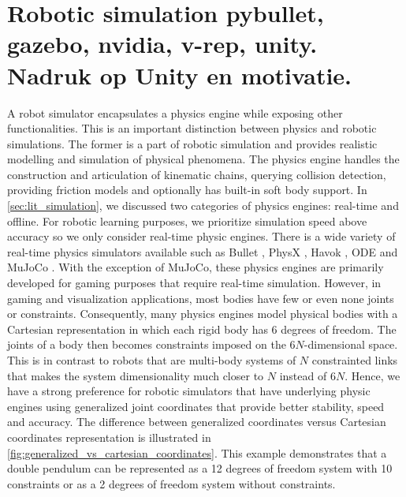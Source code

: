 \documentclass[\home/main.tex]{subfiles}
\begin{document}

\section{Robotic simulation {\tiny pybullet, gazebo, nvidia, v-rep, unity. Nadruk op Unity en motivatie.}}

A robot simulator encapsulates a physics engine while exposing other functionalities. This is an important distinction between physics and robotic simulations. The former is a part of robotic simulation and provides realistic modelling and simulation of physical phenomena. The physics engine handles the construction and articulation of kinematic chains, querying collision detection, providing friction models and optionally has built-in soft body support. 
In \cref{sec:lit_simulation}, we discussed two categories of physics engines: real-time and offline. For robotic learning purposes, we prioritize simulation speed above accuracy so we only consider real-time physic engines. There is a wide variety of real-time physics simulators available such as Bullet \autocite{Bullet}, PhysX \autocite{PhysX}, Havok \autocite{Havok}, ODE \autocite{ODE} and MuJoCo \autocite{Mujoco}. 
With the exception of MuJoCo, these physics engines are primarily developed for gaming purposes that require real-time simulation. However, in gaming and visualization applications, most bodies have few or even none joints or constraints. Consequently, many physics engines model physical bodies with a Cartesian representation in which each rigid body has 6 degrees of freedom. The joints of a body then becomes constraints imposed on the $6N$-dimensional space. This is in contrast to robots that are multi-body systems of $N$ constrainted links that makes the system dimensionality much closer to $N$ instead of $6N$. Hence, we have a strong preference for robotic simulators that have underlying physic engines using generalized joint coordinates that provide better stability, speed and accuracy. The difference between generalized coordinates versus Cartesian coordinates representation is illustrated in \cref{fig:generalized_vs_cartesian_coordinates}. This example demonstrates that a double pendulum can be represented as a 12 degrees of freedom system with 10 constraints or as a 2 degrees of freedom system without constraints. 
\end{document}
